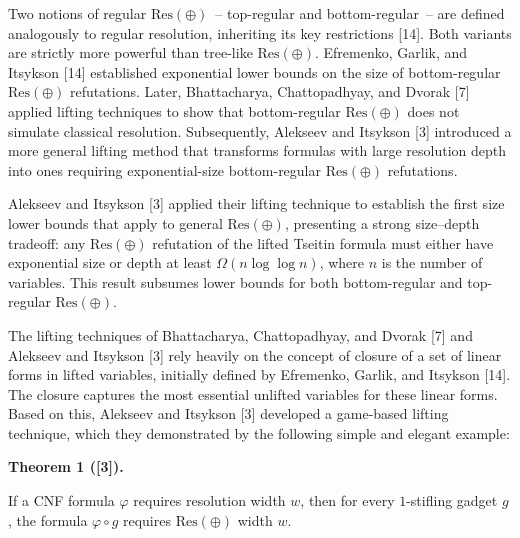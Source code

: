 \documentclass[10pt,a4paper]{article}
\begin{document}
Two notions of regular $\mathrm{Res}(\oplus)$ – top-regular and bottom-regular – are defined analogously to regular resolution, inheriting its key restrictions [14]. Both variants are strictly more powerful than tree-like $\mathrm{Res}(\oplus)$. Efremenko, Garlik, and Itsykson [14] established exponential lower bounds on the size of bottom-regular $\mathrm{Res}(\oplus)$ refutations. Later, Bhattacharya, Chattopadhyay, and Dvorak [7] applied lifting techniques to show that bottom-regular $\mathrm{Res}(\oplus)$ does not simulate classical resolution. Subsequently, Alekseev and Itsykson [3] introduced a more general lifting method that transforms formulas with large resolution depth into ones requiring exponential-size bottom-regular $\mathrm{Res}(\oplus)$ refutations.\par



Alekseev and Itsykson [3] applied their lifting technique to establish the first size lower bounds that apply to general $\mathrm{Res}(\oplus)$, presenting a strong size–depth tradeoff: any $\mathrm{Res}(\oplus)$ refutation of the lifted Tseitin formula must either have exponential size or depth at least $\Omega(n\log\log n)$, where $n$ is the number of variables. This result subsumes lower bounds for both bottom-regular and top-regular $\mathrm{Res}(\oplus)$.\par



The lifting techniques of Bhattacharya, Chattopadhyay, and Dvorak [7] and Alekseev and Itsykson [3] rely heavily on the concept of closure of a set of linear forms in lifted variables, initially defined by Efremenko, Garlik, and Itsykson [14]. The closure captures the most essential unlifted variables for these linear forms. Based on this, Alekseev and Itsykson [3] developed a game-based lifting technique, which they demonstrated by the following simple and elegant example:\par



\par\medskip\noindent\textbf{
Theorem 1 ([3]).
}\par



If a CNF formula $\varphi$ requires resolution width $w$, then for every $1$-stifling gadget $g$, the formula $\varphi\circ g$ requires $\mathrm{Res}(\oplus)$ width $w$.\par
\end{document}

